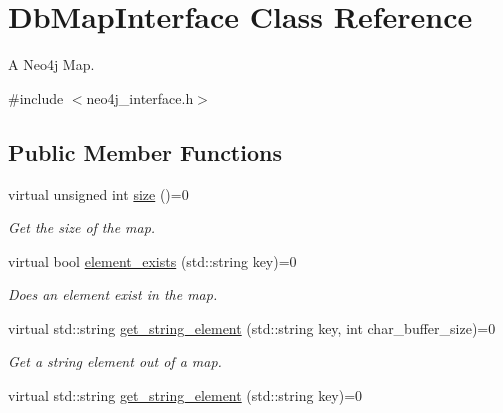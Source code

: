 \hypertarget{classDbMapInterface}{}\section{Db\+Map\+Interface Class Reference}
\label{classDbMapInterface}


A Neo4j Map.  




{\ttfamily \#include $<$neo4j\+\_\+interface.\+h$>$}

\subsection*{Public Member Functions}
\begin{DoxyCompactItemize}
\item 
virtual unsigned int \hyperlink{classDbMapInterface_a56d046e72d1856177adc71a0aaa09952}{size} ()=0\hypertarget{classDbMapInterface_a56d046e72d1856177adc71a0aaa09952}{}\label{classDbMapInterface_a56d046e72d1856177adc71a0aaa09952}

\begin{DoxyCompactList}\small\item\em Get the size of the map. \end{DoxyCompactList}\item 
virtual bool \hyperlink{classDbMapInterface_a52b0123024a6064da02e68d6c0204fdc}{element\+\_\+exists} (std\+::string key)=0\hypertarget{classDbMapInterface_a52b0123024a6064da02e68d6c0204fdc}{}\label{classDbMapInterface_a52b0123024a6064da02e68d6c0204fdc}

\begin{DoxyCompactList}\small\item\em Does an element exist in the map. \end{DoxyCompactList}\item 
virtual std\+::string \hyperlink{classDbMapInterface_ae65d2f6aaad50dc9728ba8aeb6cc557f}{get\+\_\+string\+\_\+element} (std\+::string key, int char\+\_\+buffer\+\_\+size)=0\hypertarget{classDbMapInterface_ae65d2f6aaad50dc9728ba8aeb6cc557f}{}\label{classDbMapInterface_ae65d2f6aaad50dc9728ba8aeb6cc557f}

\begin{DoxyCompactList}\small\item\em Get a string element out of a map. \end{DoxyCompactList}\item 
virtual std\+::string \hyperlink{classDbMapInterface_a26cfc56d753345b64fa9ab08b10dac34}{get\+\_\+string\+\_\+element} (std\+::string key)=0\hypertarget{classDbMapInterface_a26cfc56d753345b64fa9ab08b10dac34}{}\label{classDbMapInterface_a26cfc56d753345b64fa9ab08b10dac34}


\end{DoxyCompactItemize}
